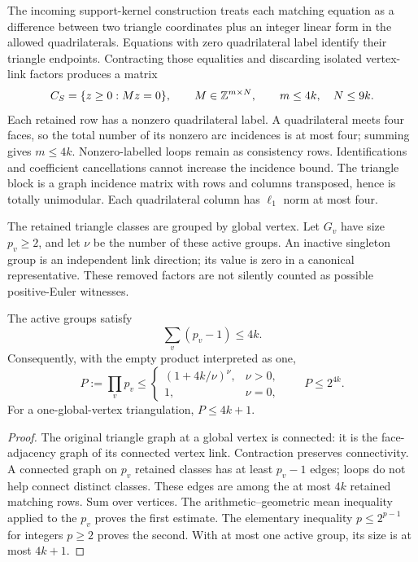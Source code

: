 The incoming support-kernel construction \cite{priorKernel} treats each matching equation as a difference between two triangle coordinates plus an integer linear form in the allowed quadrilaterals. Equations with zero quadrilateral label identify their triangle endpoints. Contracting those equalities and discarding isolated vertex-link factors produces a matrix
\begin{equation}\label{eq:small-kernel}
 C_S=\{z\ge0:Mz=0\},\qquad
 M\in\mathbb Z^{m\times N},\qquad m\le4k,\quad N\le9k.
\end{equation}
Each retained row has a nonzero quadrilateral label. A quadrilateral meets four faces, so the total number of its nonzero arc incidences is at most four; summing gives $m\le4k$. Nonzero-labelled loops remain as consistency rows. Identifications and coefficient cancellations cannot increase the incidence bound. The triangle block is a graph incidence matrix with rows and columns transposed, hence is totally unimodular. Each quadrilateral column has $\ell_1$ norm at most four.

The retained triangle classes are grouped by global vertex. Let $G_v$ have size $p_v\ge2$, and let $\nu$ be the number of these active groups. An inactive singleton group is an independent link direction; its value is zero in a canonical representative. These removed factors are not silently counted as possible positive-Euler witnesses.

\begin{lemma}\label{lem:anchor-count}
The active groups satisfy
\[
 \sum_v(p_v-1)\le4k.
\]
Consequently, with the empty product interpreted as one,
\begin{equation}\label{eq:anchor-count}
 P:=\prod_v p_v\le
 \begin{cases}(1+4k/\nu)^\nu,&\nu>0,\\1,&\nu=0,
 \end{cases}
 \qquad P\le2^{4k}.
\end{equation}
For a one-global-vertex triangulation, $P\le4k+1$.
\end{lemma}
\begin{proof}
The original triangle graph at a global vertex is connected: it is the face-adjacency graph of its connected vertex link. Contraction preserves connectivity. A connected graph on $p_v$ retained classes has at least $p_v-1$ edges; loops do not help connect distinct classes. These edges are among the at most $4k$ retained matching rows. Sum over vertices. The arithmetic--geometric mean inequality applied to the $p_v$ proves the first estimate. The elementary inequality $p\le2^{p-1}$ for integers $p\ge2$ proves the second. With at most one active group, its size is at most $4k+1$.
\end{proof}

